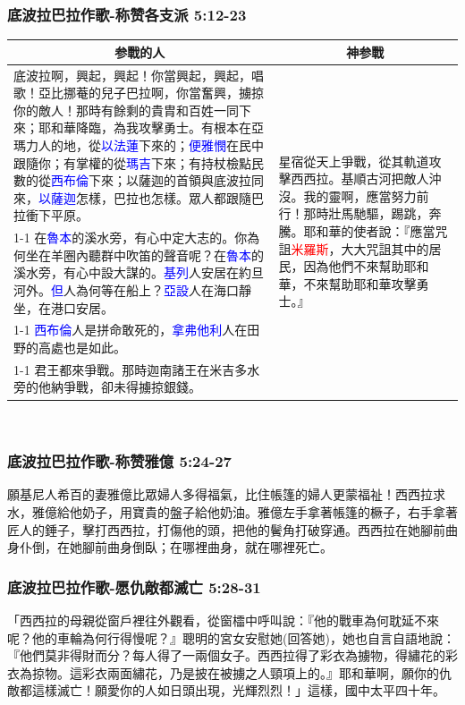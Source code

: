 \subsubsection{底波拉巴拉作歌-称赞各支派 5:12-23}
\begin{table}[H]
\centering
\begin{tabular}{p{13.75cm}|p{3.750cm}}\hline\hline
\multicolumn{1}{c|}{参戰的人}&\multicolumn{1}{c}{神参戰}\\\hline
底波拉啊，興起，興起！你當興起，興起，唱歌！亞比挪菴的兒子巴拉啊，你當奮興，擄掠你的敵人！那時有餘剩的貴胄和百姓一同下來；耶和華降臨，為我攻擊勇士。有根本在亞瑪力人的地，從\textcolor{blue}{以法蓮}下來的；\textcolor{blue}{便雅憫}在民中跟隨你；有掌權的從\textcolor{blue}{瑪吉}下來；有持杖檢點民數的從\textcolor{blue}{西布倫}下來；以薩迦的首領與底波拉同來，\textcolor{blue}{以薩迦}怎樣，巴拉也怎樣。眾人都跟隨巴拉衝下平原。
&\multirow{4}{3.9cm}{星宿從天上爭戰，從其軌道攻擊西西拉。基順古河把敵人沖沒。我的靈啊，應當努力前行！那時壯馬馳驅，踢跳，奔騰。耶和華的使者說：『應當咒詛\textcolor{red}{米羅斯}，大大咒詛其中的居民，因為他們不來幫助耶和華，不來幫助耶和華攻擊勇士。』}\\\cline{1-1}
在\textcolor{blue}{魯本}的溪水旁，有心中定大志的。你為何坐在羊圈內聽群中吹笛的聲音呢？在\textcolor{blue}{魯本}的溪水旁，有心中設大謀的。\textcolor{blue}{基列}人安居在約旦河外。\textcolor{blue}{但}人為何等在船上？\textcolor{blue}{亞設}人在海口靜坐，在港口安居。&\\\cline{1-1}
\textcolor{blue}{西布倫}人是拼命敢死的，\textcolor{blue}{拿弗他利}人在田野的高處也是如此。&\\\cline{1-1}
君王都來爭戰。那時迦南諸王在米吉多水旁的他納爭戰，卻未得擄掠銀錢。&\\\hline
\end{tabular}
\end{table} 


\subsubsection{底波拉巴拉作歌-称赞雅億 5:24-27}
願基尼人希百的妻雅億比眾婦人多得福氣，比住帳篷的婦人更蒙福祉！西西拉求水，雅億給他奶子，用寶貴的盤子給他奶油。雅億左手拿著帳篷的橛子，右手拿著匠人的錘子，擊打西西拉，打傷他的頭，把他的鬢角打破穿通。西西拉在她腳前曲身仆倒，在她腳前曲身倒臥；在哪裡曲身，就在哪裡死亡。

\subsubsection{底波拉巴拉作歌-愿仇敵都滅亡 5:28-31}
「西西拉的母親從窗戶裡往外觀看，從窗櫺中呼叫說：『他的戰車為何耽延不來呢？他的車輪為何行得慢呢？』聰明的宮女安慰她(回答她)，她也自言自語地說：『他們莫非得財而分？每人得了一兩個女子。西西拉得了彩衣為擄物，得繡花的彩衣為掠物。這彩衣兩面繡花，乃是披在被擄之人頸項上的。』耶和華啊，願你的仇敵都這樣滅亡！願愛你的人如日頭出現，光輝烈烈！」這樣，國中太平四十年。


